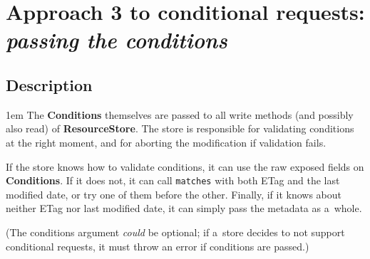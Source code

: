 \documentclass[10pt]{article}
\newenvironment{Note}
  {\begin{multicols}{3}%
     \parskip 1em}
  {\end{multicols}}
\begin{document}
\section*{Approach 3 to conditional requests: \emph{passing the conditions}}

\subsection*{Description}

\begin{Note}
The \textbf{Conditions} themselves
are passed to all write methods
(and possibly also read) of \textbf{ResourceStore}.
The store is responsible for validating conditions
at the right moment,
and for aborting the modification if validation fails.

\columnbreak
If the store knows how to validate conditions,
it can use the raw exposed fields on \textbf{Conditions}.
If it does not,
it can call \verb!matches!
with both ETag and the last modified date,
or try one of them before the other.
Finally,
if it knows about neither ETag nor last modified date,
it can simply pass the metadata as a~whole.

\columnbreak
(The conditions argument \emph{could} be optional;
 if a~store decides to not support conditional requests,
 it must throw an error if conditions are passed.)

\end{Note}
\end{document}
